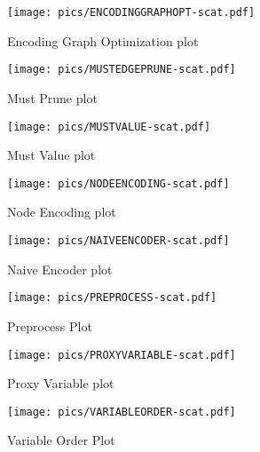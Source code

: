 \begin{figure}[htb]
	\centering
	\texttt{[image: pics/ENCODINGGRAPHOPT-scat.pdf]}
	\caption{Encoding Graph Optimization plot}
	\label{fig:encodinggraphs}
\end{figure}

\begin{figure}[htb]
	\centering
	\texttt{[image: pics/MUSTEDGEPRUNE-scat.pdf]}
	\caption{Must Prune plot}
	\label{fig:mustedgeprunes}
\end{figure}

\begin{figure}[htb]
	\centering
	\texttt{[image: pics/MUSTVALUE-scat.pdf]}
	\caption{Must Value plot}
	\label{fig:mustvalues}
\end{figure}

\begin{figure}[htb]
	\centering
	\texttt{[image: pics/NODEENCODING-scat.pdf]}
	\caption{Node Encoding plot}
	\label{fig:nodeencodings}
\end{figure}

\begin{figure}[htb]
	\centering
	\texttt{[image: pics/NAIVEENCODER-scat.pdf]}
	\caption{Naive Encoder plot}
	\label{fig:naiveencoders}
\end{figure}

\begin{figure}[htb]
	\centering
	\texttt{[image: pics/PREPROCESS-scat.pdf]}
	\caption{Preprocess Plot}
	\label{fig:preprocesss}
\end{figure}

\begin{figure}[htb]
	\centering
	\texttt{[image: pics/PROXYVARIABLE-scat.pdf]}
	\caption{Proxy Variable plot}
	\label{fig:proxyvariables}
\end{figure}

\begin{figure}[htb]
	\centering
	\texttt{[image: pics/VARIABLEORDER-scat.pdf]}
	\caption{Variable Order Plot}
	\label{fig:variableorders}
\end{figure}

